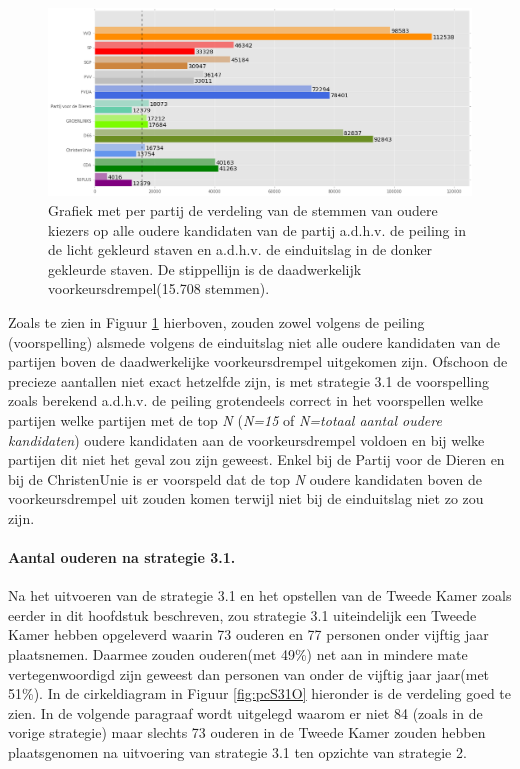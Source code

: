 \begin{figure}[H]

	\includegraphics[width=\linewidth]	{stemmen_op_ouderen_top15_of_topN_samen.png}

			\caption{Grafiek met per partij de verdeling van de stemmen van oudere kiezers op alle oudere kandidaten van de partij a.d.h.v. de peiling \citep{IPSOS} in de licht gekleurd staven en a.d.h.v. de einduitslag \citep{Kiesraad_databank} in de donker gekleurde staven. De stippellijn is de daadwerkelijk voorkeursdrempel(15.708 stemmen).}

\label{fig:stemmenS31O}
\end{figure}

Zoals te zien in Figuur \ref{fig:stemmenS31O} hierboven, zouden zowel volgens de peiling (voorspelling) alsmede volgens de einduitslag niet alle oudere kandidaten van de partijen boven de daadwerkelijke voorkeursdrempel uitgekomen zijn. Ofschoon de precieze aantallen niet exact hetzelfde zijn, is met strategie 3.1 de voorspelling zoals berekend a.d.h.v. de peiling grotendeels correct in het voorspellen welke partijen welke partijen met de top \textit{N} (\textit{N=15} of \textit{N=totaal aantal oudere kandidaten}) oudere kandidaten aan de voorkeursdrempel voldoen en bij welke partijen dit niet het geval zou zijn geweest. Enkel bij de Partij voor de Dieren en bij de ChristenUnie is er voorspeld dat de top \textit{N} oudere kandidaten boven de voorkeursdrempel uit zouden komen terwijl niet bij de einduitslag niet zo zou zijn.

\paragraph{Aantal ouderen na strategie 3.1.}
Na het uitvoeren van de strategie 3.1 en het opstellen van de Tweede Kamer zoals eerder in dit hoofdstuk beschreven, zou strategie 3.1 uiteindelijk een Tweede Kamer hebben opgeleverd waarin 73 ouderen en 77 personen onder vijftig jaar plaatsnemen. Daarmee zouden ouderen(met 49\%) net aan in mindere mate vertegenwoordigd zijn geweest dan personen van onder de vijftig jaar jaar(met 51\%). In de cirkeldiagram in Figuur \ref{fig:pcS31O} hieronder is de verdeling goed te zien. In de volgende paragraaf wordt uitgelegd waarom er niet 84 (zoals in de vorige strategie) maar slechts 73 ouderen in de Tweede Kamer zouden hebben plaatsgenomen na uitvoering van strategie 3.1 ten opzichte van strategie 2.

